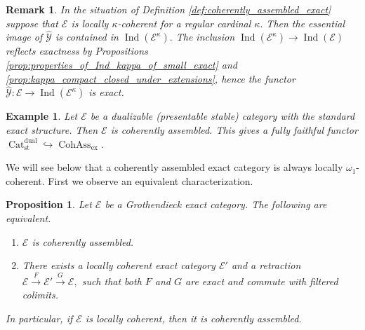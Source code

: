 \documentclass[11pt,leqno]{amsart}
\newtheorem{prop}[theo]{Proposition}
\newtheorem{remark}[theo]{Remark}
\newtheorem{example}[theo]{Example}
\numberwithin{equation}{section}
\newcommand{\xto}{\xrightarrow}
\newcommand{\hto}{\hookrightarrow}
\newcommand{\Cat}{\operatorname{Cat}}
\newcommand{\ex}{\operatorname{ex}}
\newcommand{\st}{\operatorname{st}}
\newcommand{\dual}{\operatorname{dual}}
\newcommand{\cE}{{\mathcal E}}
\newcommand{\cY}{{\mathcal Y}}
\newcommand{\Cohass}{\operatorname{CohAss}}
\newcommand{\Ind}{\operatorname{Ind}}
\begin{document}
\begin{remark}\label{rem:hat_Y_for_locally_kappa_coherent}
In the situation of Definition \ref{def:coherently_assembled_exact} suppose that $\cE$ is locally $\kappa$-coherent for a regular cardinal $\kappa.$ Then the essential image of $\hat{\cY}$ is contained in $\Ind(\cE^{\kappa}).$ The inclusion $\Ind(\cE^{\kappa})\to\Ind(\cE)$ reflects exactness by Propositions \ref{prop:properties_of_Ind_kappa_of_small_exact} and \ref{prop:kappa_compact_closed_under_extensions}, hence the functor $\hat{\cY}:\cE\to\Ind(\cE^{\kappa})$ is exact.
\end{remark}

\begin{example}
Let $\cE$ be a dualizable (presentable stable) category with the standard exact structure. Then $\cE$ is coherently assembled. This gives a fully faithful functor $\Cat_{\st}^{\dual}\hto\Cohass_{\ex}.$
\end{example}

We will see below that a coherently assembled exact category is always locally $\omega_1$-coherent. First we observe an equivalent characterization.

\begin{prop}\label{prop:coherently_assembled_as_retract}
Let $\cE$ be a Grothendieck exact category. The following are equivalent.
\begin{enumerate}[label=(\roman*),ref=(\roman*)]
	\item $\cE$ is coherently assembled. \label{coherently_assembled}
	\item There exists a locally coherent exact category $\cE'$ and a retraction $\cE\xto{F}\cE'\xto{G}\cE,$ such that both $F$ and $G$ are exact and commute with filtered colimits. \label{retract_of_locally_coherent}
\end{enumerate}
In particular, if $\cE$ is locally coherent, then it is coherently assembled.
\end{prop}
\end{document}
